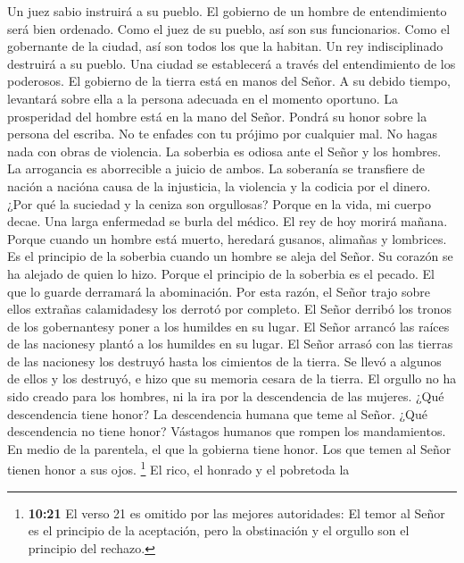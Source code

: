  Un juez sabio instruirá a su pueblo. El gobierno de un
hombre de entendimiento será bien ordenado.  Como el juez
de su pueblo, así son sus funcionarios. Como el gobernante de la ciudad,
así son todos los que la habitan.  Un rey indisciplinado
destruirá a su pueblo. Una ciudad se establecerá a través del
entendimiento de los poderosos.  El gobierno de la tierra
está en manos del Señor. A su debido tiempo, levantará sobre ella a la
persona adecuada en el momento oportuno.  La prosperidad
del hombre está en la mano del Señor. Pondrá su honor sobre la persona
del escriba.  No te enfades con tu prójimo por cualquier
mal. No hagas nada con obras de violencia.  La soberbia es
odiosa ante el Señor y los hombres. La arrogancia es aborrecible a
juicio de ambos.  La soberanía se transfiere de nación a
nacióna causa de la injusticia, la violencia y la codicia por el dinero.
 ¿Por qué la suciedad y la ceniza son orgullosas? Porque
en la vida, mi cuerpo decae.  Una larga enfermedad se
burla del médico. El rey de hoy morirá mañana.  Porque
cuando un hombre está muerto, heredará gusanos, alimañas y lombrices.
 Es el principio de la soberbia cuando un hombre se aleja
del Señor. Su corazón se ha alejado de quien lo hizo. 
Porque el principio de la soberbia es el pecado. El que lo guarde
derramará la abominación. Por esta razón, el Señor trajo sobre ellos
extrañas calamidadesy los derrotó por completo.  El Señor
derribó los tronos de los gobernantesy poner a los humildes en su lugar.
 El Señor arrancó las raíces de las nacionesy plantó a
los humildes en su lugar.  El Señor arrasó con las
tierras de las nacionesy los destruyó hasta los cimientos de la tierra.
 Se llevó a algunos de ellos y los destruyó, e hizo que
su memoria cesara de la tierra.  El orgullo no ha sido
creado para los hombres, ni la ira por la descendencia de las mujeres.
 ¿Qué descendencia tiene honor? La descendencia humana
que teme al Señor. ¿Qué descendencia no tiene honor? Vástagos humanos
que rompen los mandamientos.  En medio de la parentela,
el que la gobierna tiene honor. Los que temen al Señor tienen honor a
sus ojos.  \footnote{\textbf{10:21} El verso 21 es
  omitido por las mejores autoridades: El temor al Señor es el principio
  de la aceptación, pero la obstinación y el orgullo son el principio
  del rechazo.}  El rico, el honrado y el pobretoda la
